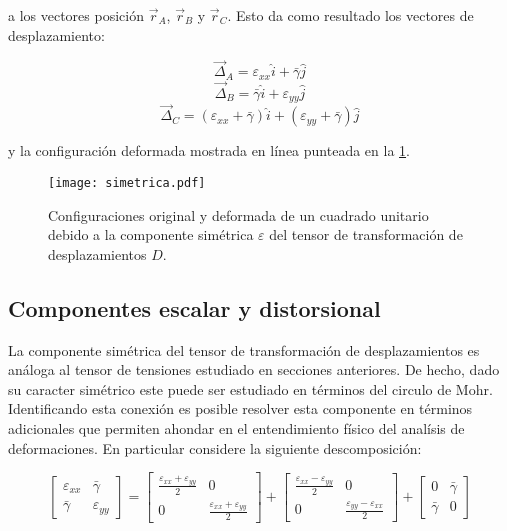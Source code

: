 \documentclass[../notas medios.tex]{subfiles}
\begin{document}
a los vectores posición $\vec{r}_A$, $\vec{r}_B$ y $\vec{r}_C$. Esto da como resultado los vectores de desplazamiento:

\[{{\vec \Delta }_A} = {\varepsilon _{xx}}\hat i + \bar{\gamma} \hat j\]
\[{{\vec \Delta }_B} = \bar{\gamma} \hat i + {\varepsilon _{yy}}\hat j\]
\[{{\vec \Delta }_C} = ({\varepsilon _{xx}} +\bar{\gamma}  )\hat i + ({\varepsilon _{yy}} + \bar{\gamma} )\hat j\]

y la configuración deformada mostrada en línea punteada en la \cref{sime}.


\begin{figure}[H]
\centering
	\texttt{[image: simetrica.pdf]}
	\caption{Configuraciones original y deformada de un cuadrado unitario debido a la componente simétrica $\varepsilon$ del tensor de transformación de desplazamientos $D$.}
	\label{sime}
\end{figure}

\subsection{Componentes escalar y distorsional}
La componente simétrica del tensor de transformación de desplazamientos es análoga al tensor de tensiones estudiado en secciones anteriores. De hecho, dado su caracter simétrico este puede ser estudiado en términos del circulo de Mohr. Identificando esta conexión es posible resolver esta componente en términos adicionales que permiten ahondar en el entendimiento físico del analísis de deformaciones. En particular considere la siguiente descomposición:

\begin{equation}
\left[ {\begin{array}{*{20}{c}}
{{\varepsilon _{xx}}}&\bar{\gamma} \\
\bar{\gamma} &{{\varepsilon _{yy}}}
\end{array}} \right] = \left[ {\begin{array}{*{20}{c}}
{\frac{{{\varepsilon _{xx}} + {\varepsilon _{yy}}}}{2}}&0\\
0&{\frac{{{\varepsilon _{xx}} + {\varepsilon _{yy}}}}{2}}
\end{array}} \right] + \left[ {\begin{array}{*{20}{c}}
{\frac{{{\varepsilon _{xx}} - {\varepsilon _{yy}}}}{2}}&0\\
0&{\frac{{{\varepsilon _{yy}} - {\varepsilon _{xx}}}}{2}}
\end{array}} \right] + \left[ {\begin{array}{*{20}{c}}
0&\bar{\gamma} \\
\bar{\gamma} &0
\end{array}} \right]
\label{otras}
\end{equation}
\end{document}
